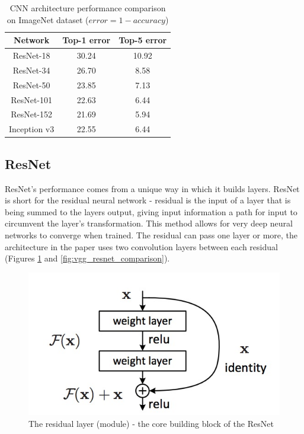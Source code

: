 \documentclass[times, utf8, diplomski]{fer}
\begin{document}
\begin{table}
\centering
\caption{CNN architecture performance comparison on ImageNet dataset ($error = 1 - accuracy$)}
\label{tb:CNN_architecutre_performance}
\begin{tabular}{ccc}
\hline 
Network    & Top-1 error & Top-5 error \\  \hline
ResNet-18 & 30.24 & 10.92 \\
ResNet-34 & 26.70 & 8.58 \\ 
ResNet-50 & 23.85 & 7.13 \\ 
ResNet-101 & 22.63 & 6.44 \\ 
ResNet-152 & 21.69 & 5.94 \\  \hline
Inception v3 & 22.55 & 6.44 \\
\hline 
\end{tabular} 
\end{table}

\subsection{ResNet} 
\label{se:resnet_architecture}

ResNet's performance comes from a unique way in which it builds layers. ResNet is short for the residual neural network - residual is the input of a layer that is being summed to the layers output, giving input information a path for input to circumvent the layer's transformation. This method allows for very deep neural networks to converge when trained. The residual can pass one layer or more, the architecture in the paper uses two convolution layers between each residual (Figures \ref{fig:residual_layer} and \ref{fig:vgg_resnet_comparison}).

\begin{figure}
  \includegraphics[scale=0.55]{figures/resiudal_layer.jpg}
  \centering
  \caption{The residual layer (module) - the core building block of the ResNet}
  \label{fig:residual_layer}
\end{figure}
\end{document}
